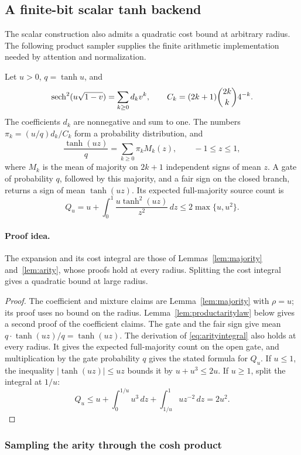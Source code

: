 \subsection{A finite-bit scalar tanh backend}
\label{sec:scalarbackend}

The scalar construction also admits a quadratic cost bound at arbitrary
radius. The following product sampler supplies the finite arithmetic
implementation needed by attention and normalization.

\begin{lemma}
\label{lem:comptanharity}
Let $u>0$, $q=\tanh u$, and
\[
 \operatorname{sech}^2(u\sqrt{1-v})=\sum_{k\ge0}d_kv^k,
 \qquad C_k=(2k+1)\binom{2k}{k}4^{-k}.
\]
The coefficients $d_k$ are nonnegative and sum to one. The numbers
$\pi_k=(u/q)d_k/C_k$ form a probability distribution, and
\[
 \frac{\tanh(uz)}q=\sum_{k\ge0}\pi_k M_k(z),\qquad -1\le z\le1,
\]
where $M_k$ is the mean of majority on $2k+1$ independent signs of mean
$z$. A gate of probability $q$, followed by this majority, and a fair
sign on the closed branch, returns a sign of mean $\tanh(uz)$. Its
expected full-majority source count is
\[
 Q_u=u+\int_0^1\frac{u\tanh^2(uz)}{z^2}\,dz
 \le2\max\{u,u^2\}.
\]
\end{lemma}
\paragraph{Proof idea.}
The expansion and its cost integral are those of
Lemmas~\ref{lem:majority} and~\ref{lem:arity}, whose proofs hold at
every radius. Splitting the cost integral gives a quadratic bound at
large radius.

\begin{proof}
The coefficient and mixture claims are Lemma~\ref{lem:majority} with
$\rho=u$; its proof uses no bound on the radius.
Lemma~\ref{lem:productaritylaw} below gives a second proof of the
coefficient claims. The gate and the fair sign give mean
$q\cdot\tanh(uz)/q=\tanh(uz)$. The derivation of
\eqref{eq:arityintegral} also holds at every radius. It gives the
expected full-majority count on the open gate, and multiplication by
the gate probability $q$ gives the stated formula for $Q_u$.
If $u\le1$, the inequality $|\tanh(uz)|\le uz$ bounds it by
$u+u^3\le2u$. If $u\ge1$, split the integral at $1/u$:
\[
 Q_u\le u+\int_0^{1/u}u^3\,dz+
                  \int_{1/u}^1 u z^{-2}\,dz=2u^2.
\]
\end{proof}

\subsubsection{Sampling the arity through the cosh product}
\label{sec:productarity}

